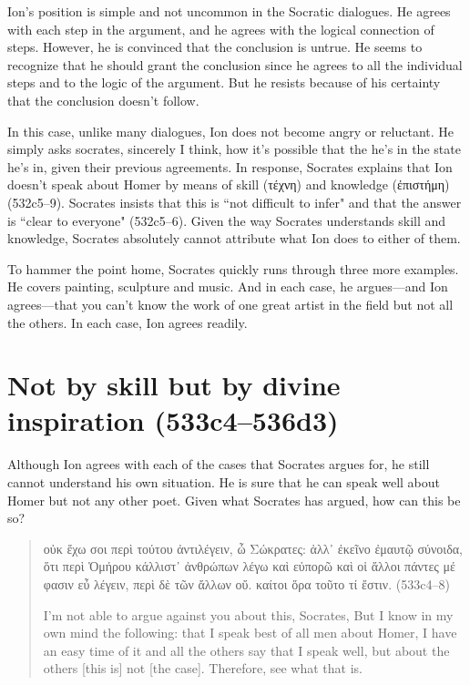\documentclass[11pt]{article}
\begin{document}
Ion's position is simple and not uncommon in the Socratic dialogues.  He
agrees with each step in the argument, and he agrees with the logical
connection of steps.  However, he is convinced that the conclusion is
untrue.  He seems to recognize that he should grant the conclusion since he
agrees to all the individual steps and to the logic of the argument.  But
he resists because of his certainty that the conclusion doesn't follow.

In this case, unlike many dialogues, Ion does not become angry or
reluctant.  He simply asks socrates, sincerely I think, how it's possible
that the he's in the state he's in, given their previous agreements.  In
response, Socrates explains that Ion doesn't speak about Homer by means of
skill ({\g τέχνη}) and knowledge ({\g ἐπιστήμη}) (532c5--9).  Socrates
insists that this is ``not difficult to infer" and that the answer is
``clear to everyone" (532c5--6).  Given the way Socrates understands skill
and knowledge, Socrates absolutely cannot attribute what Ion does to either
of them.

To hammer the point home, Socrates quickly runs through three more
examples.  He covers painting, sculpture and music.  And in each case, he
argues---and Ion agrees---that you can't know the work of one great artist
in the field but not all the others.  In each case, Ion agrees readily.


\section{Not by skill but by divine inspiration (533c4--536d3)}

Although Ion agrees with each of the cases that Socrates argues for, he
still cannot understand his own situation.  He is sure that he can speak
well about Homer but not any other poet. Given what Socrates has argued,
how can this be so?

\begin{quote}
    {\g
    οὐκ ἔχω σοι περὶ τούτου ἀντιλέγειν, ὦ Σώκρατες: ἀλλ᾽ ἐκεῖνο ἐμαυτῷ
    σύνοιδα, ὅτι περὶ Ὁμήρου κάλλιστ᾽ ἀνθρώπων λέγω καὶ εὐπορῶ καὶ οἱ ἄλλοι
    πάντες μέ φασιν εὖ λέγειν, περὶ δὲ τῶν ἄλλων οὔ. καίτοι ὅρα τοῦτο τί
    ἔστιν.
    } (533c4--8)

    I'm not able to argue against you about this, Socrates, But I know in
    my own mind the following: that I speak best of all men about Homer,
    I have an easy time of it and all the others say that I speak well, but
    about the others [this is] not [the case].  Therefore, see what that
    is.
\end{quote}
\end{document}
